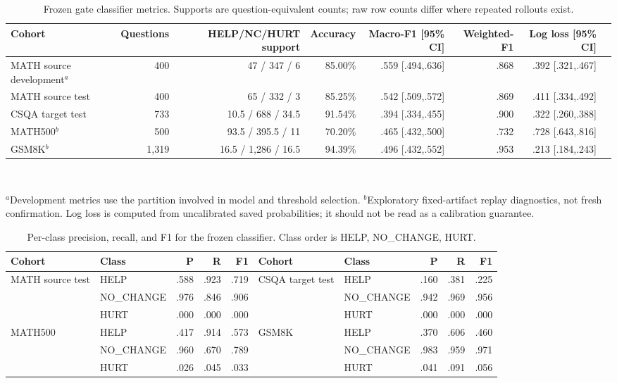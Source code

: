 \documentclass[conference]{IEEEtran}
\begin{document}
\begin{table}[t]
\caption{Frozen gate classifier metrics. Supports are question-equivalent counts; raw row counts differ where repeated rollouts exist.}
\label{tab:classoverall}
\centering\small
\begin{tabular}{lrrrrrrr}
\toprule
\textbf{Cohort} & \textbf{Questions} & \textbf{HELP/NC/HURT support} & \textbf{Accuracy} & \textbf{Macro-F1 [95\% CI]} & \textbf{Weighted-F1} & \textbf{Log loss [95\% CI]}\\
\midrule
MATH source development$^a$ & 400 & 47 / 347 / 6 & 85.00\% & .559 [.494,.636] & .868 & .392 [.321,.467]\\
MATH source test & 400 & 65 / 332 / 3 & 85.25\% & .542 [.509,.572] & .869 & .411 [.334,.492]\\
CSQA target test & 733 & 10.5 / 688 / 34.5 & 91.54\% & .394 [.334,.455] & .900 & .322 [.260,.388]\\
MATH500$^b$ & 500 & 93.5 / 395.5 / 11 & 70.20\% & .465 [.432,.500] & .732 & .728 [.643,.816]\\
GSM8K$^b$ & 1,319 & 16.5 / 1,286 / 16.5 & 94.39\% & .496 [.432,.552] & .953 & .213 [.184,.243]\\
\bottomrule
\end{tabular}
\\[2pt]\parbox{\textwidth}{\scriptsize $^a$Development metrics use the partition involved in model and threshold selection. $^b$Exploratory fixed-artifact replay diagnostics, not fresh confirmation. Log loss is computed from uncalibrated saved probabilities; it should not be read as a calibration guarantee.}
\end{table}

\begin{table}[t]
\caption{Per-class precision, recall, and F1 for the frozen classifier. Class order is HELP, NO\_CHANGE, HURT.}
\label{tab:perclass}
\centering\small
\begin{tabular}{llrrr|llrrr}
\toprule
\textbf{Cohort} & \textbf{Class} & \textbf{P} & \textbf{R} & \textbf{F1} & \textbf{Cohort} & \textbf{Class} & \textbf{P} & \textbf{R} & \textbf{F1}\\
\midrule
MATH source test & HELP & .588 & .923 & .719 & CSQA target test & HELP & .160 & .381 & .225\\
 & NO\_CHANGE & .976 & .846 & .906 &  & NO\_CHANGE & .942 & .969 & .956\\
 & HURT & .000 & .000 & .000 &  & HURT & .000 & .000 & .000\\
MATH500 & HELP & .417 & .914 & .573 & GSM8K & HELP & .370 & .606 & .460\\
 & NO\_CHANGE & .960 & .670 & .789 &  & NO\_CHANGE & .983 & .959 & .971\\
 & HURT & .026 & .045 & .033 &  & HURT & .041 & .091 & .056\\
\bottomrule
\end{tabular}
\end{table}
\end{document}
